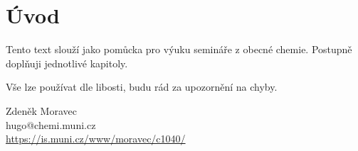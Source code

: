 
\section{Úvod}

Tento text slouží jako pomůcka pro výuku semináře z obecné chemie. Postupně doplňuji jednotlivé kapitoly.

Vše lze používat dle libosti, budu rád za upozornění na chyby.

Zdeněk Moravec\\
hugo@chemi.muni.cz\\
\url{https://is.muni.cz/www/moravec/c1040/}\\